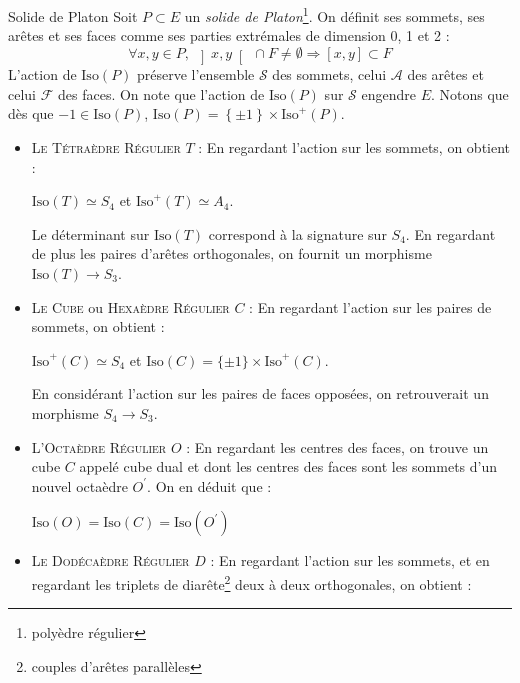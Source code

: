 \documentclass{cours}
\begin{document}
\begin{définition}{Solide de Platon}{}
    Soit $P \subset E$ un \emph{solide de Platon}\footnote{polyèdre régulier}. On définit ses sommets, ses arêtes et ses faces comme ses parties extrémales de dimension 0, 1 et 2 :
    \[
        \forall x, y \in P, \ \left]x, y \right[\ \cap F \neq \emptyset \Rightarrow \left[x, y\right]\subset F
    \]
    L'action de $\text{Iso}(P)$ préserve l'ensemble $\mathscr{S}$ des sommets, celui $\mathscr{A}$ des arêtes et celui $\mathscr{F}$ des faces. On note que l'action de $\text{Iso}(P)$ sur $\mathscr{S}$ engendre $E$. Notons que dès que $-1 \in \text{Iso}(P)$, $\text{Iso}(P) = \left\{\pm 1\right\} \times \text{Iso}^{+}(P)$.
\end{définition}
\begin{center}
    \begin{itemize}
        \item \textsc{Le Tétraèdre Régulier} $T$ : En regardant l'action sur les sommets, on obtient :
              \begin{propositionfr}{}{}
                  $\text{Iso}(T) \simeq S_{4}$ et $\text{Iso}^{+}(T) \simeq A_{4}$.
              \end{propositionfr} Le déterminant sur $\text{Iso}(T)$ correspond à la signature sur $S_{4}$. En regardant de plus les paires d'arêtes orthogonales, on fournit un morphisme $\text{Iso}(T) \rightarrow S_{3}$.
        \item \textsc{Le Cube} ou \textsc{Hexaèdre Régulier} $C$ : En regardant l'action sur les paires de sommets, on obtient :
              \begin{propositionfr}{}{}
                  $\text{Iso}^{+}(C) \simeq S_{4}$ et $\text{Iso}(C) = \{\pm 1\} \times \text{Iso}^{+}(C)$.
              \end{propositionfr}
              En considérant l'action sur les paires de faces opposées, on retrouverait un morphisme $S_{4} \rightarrow S_{3}$.
        \item \textsc{L'Octaèdre Régulier} $O$ : En regardant les centres des faces, on trouve un cube $C$ appelé cube dual et dont les centres des faces sont les sommets d'un nouvel octaèdre $O^{'}$. On en déduit que :
              \begin{propositionfr}{}{}
                  $\text{Iso}(O) = \text{Iso}(C) = \text{Iso}(O^{'})$
              \end{propositionfr}
        \item \textsc{Le Dodécaèdre Régulier} $D$ : En regardant l'action sur les sommets, et en regardant les triplets de diarête\footnote{couples d'arêtes parallèles} deux à deux orthogonales, on obtient :

\end{itemize}
\end{center}
\end{document}

